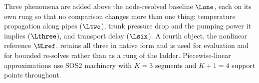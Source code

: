 

Three phenomena are added above the node-resolved baseline $\Lone$, each on its own rung
so that no comparison changes more than one thing: temperature propagation along pipes
($\Ltwo$), trunk pressure drop and the pumping power it implies ($\Lthree$), and
transport delay ($\Lsix$). A fourth object, the nonlinear reference $\NLref$, retains all
three in native form and is used for evaluation and for bounded re-solves rather than as a
rung of the ladder. Piecewise-linear approximations use SOS2 machinery with $K = 3$
segments and $K + 1 = 4$ support points throughout.

